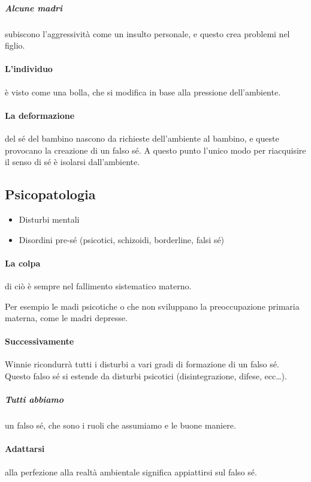 \documentclass[12pt, a4paper]{article}
\begin{document}
\subparagraph{Alcune madri} subiscono l'aggressivit\`a come un insulto personale, e questo crea problemi nel figlio.

\paragraph{L'individuo} \`e visto come una bolla, che si modifica in base alla pressione dell'ambiente.

\paragraph{La deformazione} del s\'e del bambino nascono da richieste dell'ambiente al bambino, e queste provocano la creazione di un falso s\'e. A questo punto l'unico modo per riacquisire il senso di s\'e \`e isolarsi dall'ambiente.


\subsection{Psicopatologia}

\begin{itemize}
    \item Disturbi mentali
    \item Disordini pre-s\'e (psicotici, schizoidi, borderline, falsi s\'e)
\end{itemize}


\paragraph{La colpa} di ciò \`e sempre nel fallimento sistematico materno.

Per esempio le madi psicotiche o che non sviluppano la preoccupazione primaria materna, come le madri depresse.

\paragraph{Successivamente} Winnie ricondurr\`a tutti i disturbi a vari gradi di formazione di un falso s\'e. Questo falso s\'e si estende da disturbi psicotici (disintegrazione, difese, ecc\ldots).

\subparagraph{Tutti abbiamo} un falso s\'e, che sono i ruoli che assumiamo e le buone maniere.

\paragraph{Adattarsi} alla perfezione alla realt\`a ambientale significa appiattirsi sul falso s\'e.
\end{document}
